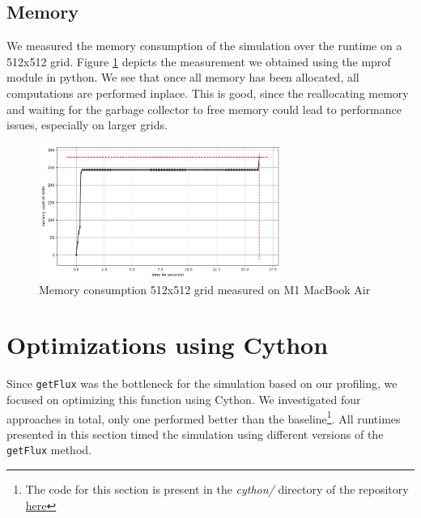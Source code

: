 \documentclass[a4paper,10pt]{article}
\begin{document}
\subsection{Memory}
We measured the memory consumption of the simulation over the runtime on a 512x512 grid.
Figure \ref{fig:memory_over_simulation} depicts the measurement we obtained using the mprof module in python.
We see that once all memory has been allocated, all computations are performed inplace.
This is good, since the reallocating memory and waiting for the garbage collector to free memory could lead to performance issues, especially on larger grids.

\begin{figure}[h]
  \centering
  \includegraphics[width=0.7\textwidth]{images/baseline/baseline_memory_512.png}
  \caption{Memory consumption 512x512 grid measured on M1 MacBook Air}
  \label{fig:memory_over_simulation}
\end{figure}

\section{Optimizations using Cython}
Since \verb|getFlux| was the bottleneck for the simulation based on our profiling, we focused on optimizing this function using Cython.
We investigated four approaches in total, only one performed better than the baseline\footnote{The code for this section is present in the \textit{cython/} directory of the repository \href{https://github.com/paulmyr/DD2358-HPC25/blob/master/10_project_rishi_paul/code/cython/finitevolume_cython_lib.pyx}{here}}.
All runtimes presented in this section timed the simulation using different versions of the \verb|getFlux| method.
\end{document}
